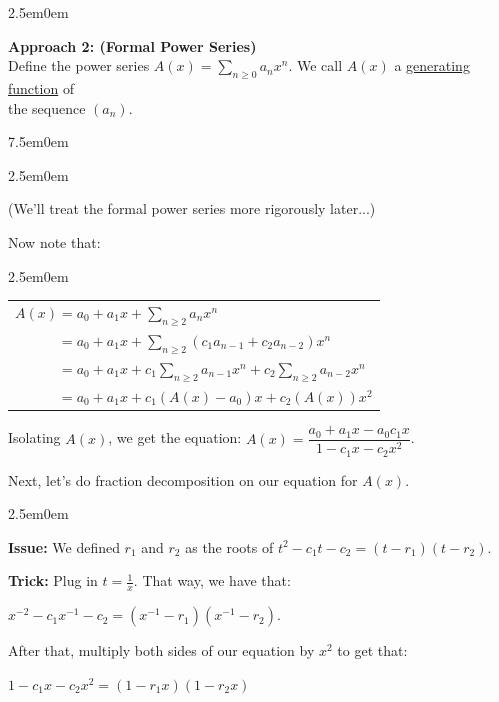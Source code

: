 \documentclass{book}
\newcommand{\hThree}{%
   \color{PineGreen!85!Orange}
   \fontsize{12}{14}\selectfont%
}
\newcommand{\teachComment}{
   \color{Orange}%
   \fontsize{12}{14}\selectfont%
}
\newenvironment{myIndent}{%
   \begin{adjustwidth}{2.5em}{0em}%
}{%
   \end{adjustwidth}%
}
\newenvironment{myTindent}{%
   \begin{adjustwidth}{7.5em}{0em}%
}{%
   \end{adjustwidth}%
}
\newcommand{\udefine}[1]{{%
   \setulcolor{Red}%
   \setul{0.14em}{0.07em}%
   \ul{#1}%
}}
\newcommand{\blab}[1]{\textbf{#1}}
\newcommand{\retTwo}{\hfill\bigbreak}
\begin{document}
\begin{myIndent}
   \blab{Approach 2: (Formal Power Series)}\\
   Define the power series $A(x) = \sum\limits_{n \geq 0}a_nx^n$. We call $A(x)$ a \udefine{generating function} of\\ [-10pt] the sequence $(a_n)$.
   
   
   \begin{myTindent}\begin{myIndent}\teachComment
      (We'll treat the formal power series more rigorously later...)\retTwo
   \end{myIndent}\end{myTindent}

   Now note that:\\ [-10pt]
   \begin{myIndent}\hThree
      \begin{tabular}{l}
         $ A(x) = a_0 + a_1x + \sum\limits_{n \geq 2} a_nx^n$\\ [14pt]
         $ \phantom{A(x)} = a_0 + a_1x + \sum\limits_{n \geq 2} (c_1a_{n-1} + c_2a_{n-2})x^n$\\ [14pt]
         $ \phantom{A(x)} = a_0 + a_1x + c_1\sum\limits_{n \geq 2} a_{n-1}x^n + c_2\sum\limits_{n \geq 2}a_{n-2}x^n$\\ [14pt]
         $\phantom{A(x)} = a_0 + a_1x + c_1(A(x) - a_0)x + c_2(A(x))x^2$
      \end{tabular}\retTwo
   \end{myIndent}

   Isolating $A(x)$, we get the equation: $A(x) = \dfrac{a_0 + a_1x - a_0c_1x}{1 - c_1x - c_2x^2}$.\retTwo

   Next, let's do fraction decomposition on our equation for $A(x)$.
   \begin{myIndent}\hThree
      \blab{Issue:} We defined $r_1$ and $r_2$ as the roots of $t^2 - c_1t - c_2 = (t - r_1)(t - r_2)$.\retTwo

      \blab{Trick:} Plug in $t = \frac{1}{x}$. That way, we have that:
      
      {\centering$x^{-2} - c_1x^{-1} - c_2 = (x^{-1} - r_1)(x^{-1} - r_2)$.\retTwo\par}
      
      After that, multiply both sides of our equation by $x^2$ to get that:

      {\centering $ 1 - c_1x - c_2x^2 = (1 - r_1x)(1 - r_2x)$ \retTwo\par}
   \end{myIndent}


\end{myIndent}
\end{document}
